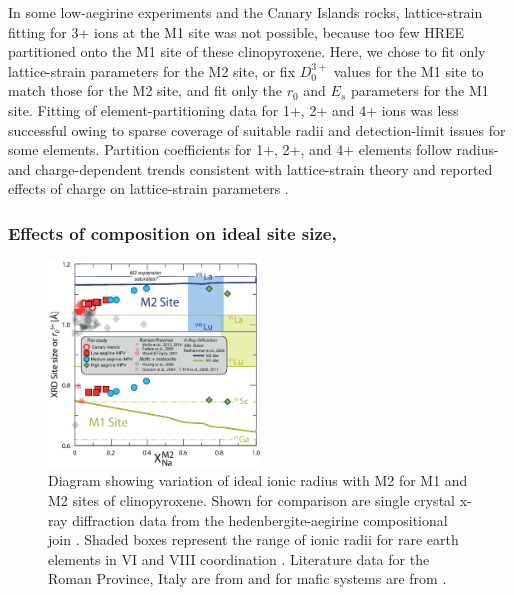 \documentclass[review,authoryear,12pt]{elsarticle}
\begin{document}
In some low-aegirine experiments and the Canary Islands rocks, lattice-strain fitting for 3+ ions at the M1 site was not possible, because too few HREE partitioned onto the M1 site of these clinopyroxene. Here, we chose to fit only lattice-strain parameters for the M2 site, or fix $D_0^{3+}$ values for the M1 site to match those for the M2 site, and fit only the $r_0$ and $E_{s}$ parameters for the M1 site. Fitting of element-partitioning data for 1+, 2+ and 4+ ions was less successful owing to sparse coverage of suitable radii and detection-limit issues for some elements. Partition coefficients for 1+, 2+, and 4+ elements follow radius- and charge-dependent trends consistent with lattice-strain theory and reported effects of charge on lattice-strain parameters \citep[Fig. \ref{8_Latticestrain3}b, e.g.,][]{Hazen1979, Law2000, Adam2006}.


\subsubsection{Effects of composition on ideal site size, }

        \begin{figure}[bt]
        \begin{center}
        \includegraphics[width=0.5\textwidth]{9_Px_XRD_Jun2017-01.eps}
        \caption[Variation of ideal ionic radius $r_0^{3+}$ with M2 for M1 and M2 sites of clinopyroxene]{Diagram showing variation of ideal ionic radius  with M2 for M1 and M2 sites of clinopyroxene. Shown for comparison are single crystal x-ray diffraction data from the hedenbergite-aegirine compositional join \citep[heavy solid lines, from][]{Redhammer2006}. Shaded boxes represent the range of ionic radii for rare earth elements in VI and VIII coordination \citep{Shannon1976}. Literature data for the Roman Province, Italy are from \citet{Fedele2009, Mollo2013, Mollo2016, Wood2001cpx} and for mafic systems are from \citet{Hill2000, Hill2011, Gaetani2004, Huang2006}.}
        \label{9_Px_XRD}
        \end{center}
        \end{figure}
        
\end{document}
